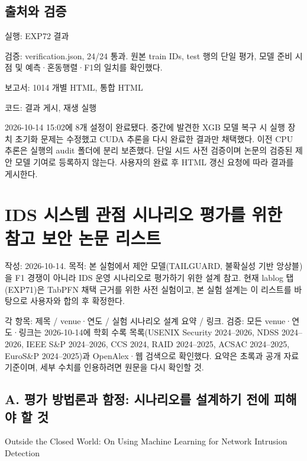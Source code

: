 \subsection{출처와 검증}
\par\noindent \textbullet\enspace 실행: EXP72 결과


\par\noindent \textbullet\enspace 검증: verification.json, 24/\allowbreak{}24 통과. 원본 train IDs, test 행의 단일 평가, 모델 준비 시점 및 예측·혼동행렬·F1의 일치를 확인했다.


\par\noindent \textbullet\enspace 보고서: 1014 개별 HTML, 통합 HTML


\par\noindent \textbullet\enspace 코드: 결과 게시, 재생 실행


2026-10-14 15:02에 8개 설정이 완료됐다. 중간에 발견한 XGB 모델 복구 시 실행 장치 초기화 문제는 수정했고 CUDA 추론을 다시 완료한 결과만 채택했다. 이전 CPU 추론은 실행의 audit 폴더에 분리 보존했다. 단일 시드 사전 검증이며 논문의 검증된 제안 모델 기여로 등록하지 않는다. 사용자의 완료 후 HTML 갱신 요청에 따라 결과를 게시한다.



\section{IDS 시스템 관점 시나리오 평가를 위한 참고 보안 논문 리스트}
작성: 2026-10-14. 목적: 본 실험에서 제안 모델(TAILGUARD, 불확실성 기반 앙상블)을 F1 경쟁이 아니라 IDS 운영 시나리오로 평가하기 위한 설계 참고. 현재 lablog 탭(EXP71)은 TabPFN 채택 근거를 위한 사전 실험이고, 본 실험 설계는 이 리스트를 바탕으로 사용자와 합의 후 확정한다.

각 항목: 제목 /\allowbreak{} venue·연도 /\allowbreak{} 실험 시나리오 설계 요약 /\allowbreak{} 링크. 검증: 모든 venue·연도·링크는 2026-10-14에 학회 수록 목록(USENIX Security 2024–2026, NDSS 2024–2026, IEEE S\&P 2024–2026, CCS 2024, RAID 2024–2025, ACSAC 2024–2025, EuroS\&P 2024–2025)과 OpenAlex·웹 검색으로 확인했다. 요약은 초록과 공개 자료 기준이며, 세부 수치를 인용하려면 원문을 다시 확인할 것.

\subsection{A. 평가 방법론과 함정: 시나리오를 설계하기 전에 피해야 할 것}
\par\noindent \textbullet\enspace Outside the Closed World: On Using Machine Learning for Network Intrusion Detection

